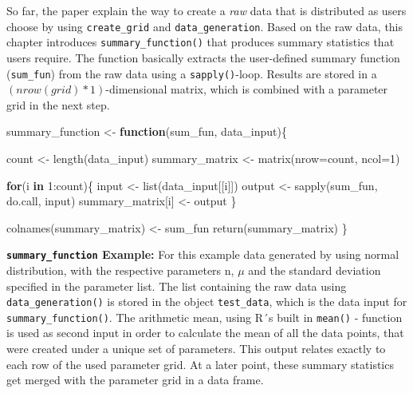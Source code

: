 \documentclass[11pt,a4paper]{article}
\newenvironment{Shaded}{\begin{snugshade}}{\end{snugshade}}
\newcommand{\AttributeTok}[1]{\textcolor[rgb]{0.77,0.63,0.00}{#1}}
\newcommand{\ControlFlowTok}[1]{\textcolor[rgb]{0.13,0.29,0.53}{\textbf{#1}}}
\newcommand{\DecValTok}[1]{\textcolor[rgb]{0.00,0.00,0.81}{#1}}
\newcommand{\FunctionTok}[1]{\textcolor[rgb]{0.00,0.00,0.00}{#1}}
\newcommand{\NormalTok}[1]{#1}
\newcommand{\OtherTok}[1]{\textcolor[rgb]{0.56,0.35,0.01}{#1}}
\newcommand{\SpecialCharTok}[1]{\textcolor[rgb]{0.00,0.00,0.00}{#1}}
\begin{document}
So far, the paper explain the way to create a \emph{raw} data that is
distributed as users choose by using \texttt{create\_grid} and
\texttt{data\_generation}. Based on the raw data, this chapter
introduces \texttt{summary\_function()} that produces summary statistics
that users require. The function basically extracts the user-defined
summary function (\texttt{sum\_fun}) from the raw data using a
\texttt{sapply()}-loop. Results are stored in a
\((nrow(grid ) * 1)\)-dimensional matrix, which is combined with a
parameter grid in the next step.

\begin{Shaded}
\begin{Highlighting}[]
\NormalTok{summary\_function }\OtherTok{\textless{}{-}} \ControlFlowTok{function}\NormalTok{(sum\_fun, data\_input)\{}
  
\NormalTok{  count }\OtherTok{\textless{}{-}} \FunctionTok{length}\NormalTok{(data\_input)}
\NormalTok{  summary\_matrix }\OtherTok{\textless{}{-}} \FunctionTok{matrix}\NormalTok{(}\AttributeTok{nrow=}\NormalTok{count, }\AttributeTok{ncol=}\DecValTok{1}\NormalTok{)}
  
  \ControlFlowTok{for}\NormalTok{(i }\ControlFlowTok{in} \DecValTok{1}\SpecialCharTok{:}\NormalTok{count)\{}
\NormalTok{    input }\OtherTok{\textless{}{-}} \FunctionTok{list}\NormalTok{(data\_input[[i]])}
\NormalTok{    output }\OtherTok{\textless{}{-}} \FunctionTok{sapply}\NormalTok{(sum\_fun, do.call, input)}
\NormalTok{    summary\_matrix[i] }\OtherTok{\textless{}{-}}\NormalTok{ output}
\NormalTok{  \}}

  \FunctionTok{colnames}\NormalTok{(summary\_matrix) }\OtherTok{\textless{}{-}}\NormalTok{ sum\_fun}
  \FunctionTok{return}\NormalTok{(summary\_matrix)}
\NormalTok{\}}
\end{Highlighting}
\end{Shaded}

\textbf{\texttt{summary\_function} Example:} For this example data
generated by using normal distribution, with the respective parameters
n, \(\mu\) and the standard deviation specified in the parameter list.
The list containing the raw data using \texttt{data\_generation()} is
stored in the object \texttt{test\_data}, which is the data input for
\texttt{summary\_function()}. The arithmetic mean, using R´s built in
\texttt{mean()} - function is used as second input in order to calculate
the mean of all the data points, that were created under a unique set of
parameters. This output relates exactly to each row of the used
parameter grid. At a later point, these summary statistics get merged
with the parameter grid in a data frame.
\end{document}
